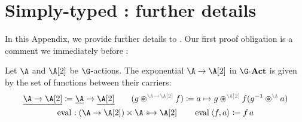 \section{Simply-typed \WLOG: further details}

In this Appendix, we provide further details to .
Our first proof obligation is a comment we immediately before :

\begin{lemma}
  Let $\A$ and $\B$ be $\G$-actions. The exponential $\A \to \B$ in $\Action\G$ is given by the set of functions between their carriers:
  \begin{gather*}
  \carrier{\A \to \B}\definedby \carrier\A \to \carrier\B
  \qquad
  (g \act[\A \to \B] f) \definedby \fun a g \act[\B] f(\inv g\act[\A]a)
  \\
  \eval : (\A \to \B) \times \A \equito \B
  \qquad
  \eval \pair fa \definedby f\,a
  \end{gather*}
\end{lemma}
